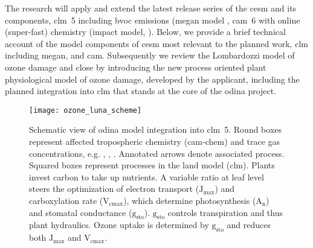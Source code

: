 The research will apply and extend the latest release series of the \gls{cesm} and its components, \gls{clm}~5 including \gls{bvoc} emissions (\gls{megan} model \parencite{ACP:Guenther2006}, \gls{cam}~6 with online (super-fast) chemistry (\gls{impact} model, \textcite{JGR:Rotman2004}). Below, we provide  a brief technical account of the model components of \gls{cesm} most relevant to the planned work, \gls{clm} including \gls{megan}, and \gls{cam}. Subsequently we review  the Lombardozzi model of ozone damage and close by introducing the new process oriented plant physiological model of ozone damage, developed by the applicant, including the planned integration into \gls{clm} that stands at the core of the \gls{odina} project.

\begin{wrapfigure}[31]{L}[0pt]{0.5\textwidth}
  \centering
  \texttt{[image: ozone\_luna\_scheme]}
  \caption{Schematic view of \gls{odina} model integration into \gls{clm}~5. Round boxes represent affected tropospheric chemistry (\gls{cam}-chem) and trace gas concentrations, e.g. \ch{[CO_2]}, \ch{[O_3]}, \ch{[H_2O]}. Annotated arrows denote associated process. Squared boxes represent processes in the land model (\gls{clm}). Plants {\color{darkgray}invest carbon} to {\color{darkgray}take up nutrients}. A variable  ratio at leaf level steers the optimization of electron transport ($\mathrm{J_{max}}$) and carboxylation rate ($\mathrm{V_{cmax}}$), which determine photosynthesis ($\mathrm{A_n}$) and stomatal conductance ($\mathrm{g_{sto}}$). $\mathrm{g_{sto}}$ controls transpiration and thus {\color{blue}plant hydraulics}. {\color{red}Ozone uptake} is determined by $\mathrm{g_{sto}}$ and reduces both $\mathrm{J_{max}}$ and $\mathrm{V_{cmax}}$.
}
  \label{fig:ozone_odina}
\end{wrapfigure}

